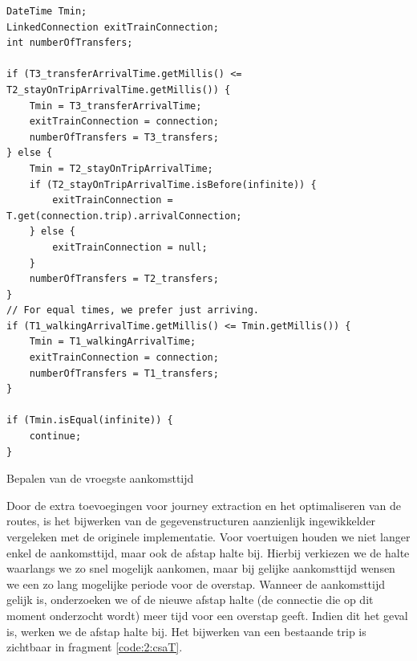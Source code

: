 \begin{code}[h]
\begin{verbatim}
DateTime Tmin;
LinkedConnection exitTrainConnection;
int numberOfTransfers;

if (T3_transferArrivalTime.getMillis() <= T2_stayOnTripArrivalTime.getMillis()) {
	Tmin = T3_transferArrivalTime;
	exitTrainConnection = connection;
	numberOfTransfers = T3_transfers;
} else {
	Tmin = T2_stayOnTripArrivalTime;
	if (T2_stayOnTripArrivalTime.isBefore(infinite)) {
		exitTrainConnection = T.get(connection.trip).arrivalConnection;
	} else {
		exitTrainConnection = null;
	}
	numberOfTransfers = T2_transfers;
}
// For equal times, we prefer just arriving.
if (T1_walkingArrivalTime.getMillis() <= Tmin.getMillis()) {
	Tmin = T1_walkingArrivalTime;
	exitTrainConnection = connection;
	numberOfTransfers = T1_transfers;
}

if (Tmin.isEqual(infinite)) {
	continue;
}
		\end{verbatim}
		\caption[CSA: Bepalen van vroegste aankomsttijd]{Bepalen van de vroegste aankomsttijd}
		\label{code:2:csaMin}
\end{code}
Door de extra toevoegingen voor journey extraction en het optimaliseren van de routes, is het bijwerken van de gegevenstructuren aanzienlijk ingewikkelder vergeleken met de originele implementatie. Voor voertuigen houden we niet langer enkel de aankomsttijd, maar ook de afstap halte bij. Hierbij verkiezen we de halte waarlangs we zo snel mogelijk aankomen, maar bij gelijke aankomsttijd wensen we een zo lang mogelijke periode voor de overstap. Wanneer de aankomsttijd gelijk is, onderzoeken we of de nieuwe afstap halte (de connectie die op dit moment onderzocht wordt) meer tijd voor een overstap geeft. Indien dit het geval is, werken we de afstap halte bij. Het bijwerken van een bestaande trip is zichtbaar in fragment \ref{code:2:csaT}.
